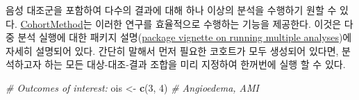 \documentclass[11pt]{book}
\newenvironment{Shaded}{\begin{snugshade}}{\end{snugshade}}
\newcommand{\KeywordTok}[1]{\textcolor[rgb]{0.13,0.29,0.53}{\textbf{#1}}}
\newcommand{\DecValTok}[1]{\textcolor[rgb]{0.00,0.00,0.81}{#1}}
\newcommand{\StringTok}[1]{\textcolor[rgb]{0.31,0.60,0.02}{#1}}
\newcommand{\CommentTok}[1]{\textcolor[rgb]{0.56,0.35,0.01}{\textit{#1}}}
\newcommand{\NormalTok}[1]{#1}
\theoremstyle{definition}
\theoremstyle{definition}
\theoremstyle{definition}
\theoremstyle{remark}
\begin{document}
음성 대조군을 포함하여 다수의 결과에 대해 하나 이상의 분석을 수행하기
원할 수 있다.
\href{https://ohdsi.github.io/CohortMethod/}{CohortMethod}는 이러한
연구를 효율적으로 수행하는 기능을 제공한다. 이것은 다중 분석 실행에 대한
패키지
설명(\href{https://ohdsi.github.io/CohortMethod/articles/MultipleAnalyses.html}{package
vignette on running multiple analyses})에 자세히 설명되어 있다. 간단히
말해서 먼저 필요한 코호트가 모두 생성되어 있다면, 분석하고자 하는 모든
대상-대조-결과 조합을 미리 지정하여 한꺼번에 실행 할 수 있다.

\begin{Shaded}
\begin{Highlighting}[]
\CommentTok{# Outcomes of interest:}
\NormalTok{ois <-}\StringTok{ }\KeywordTok{c}\NormalTok{(}\DecValTok{3}\NormalTok{, }\DecValTok{4}\NormalTok{) }\CommentTok{# Angioedema, AMI}


\end{Highlighting}
\end{Shaded}
\end{document}
